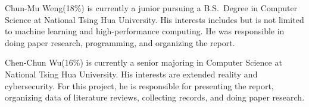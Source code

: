 \documentclass[journal]{IEEEtran}
\begin{document}
\newpage



\nocite{*}



%



\begin{IEEEbiography}{Chun-Mu Weng}(18\%)
is currently a junior pursuing a B.S.~Degree in Computer Science at National Tsing Hua University. His interests includes but is not limited to machine learning and high-performance computing. He was responsible in doing paper research, programming, and organizing the report.
\end{IEEEbiography}

\begin{IEEEbiography}{Chen-Chun Wu}(16\%)
is currently a senior majoring in Computer Science at National Tsing Hua University. His interests are extended reality and cybersecurity. For this project, he is responsible for presenting the report, organizing data of literature reviews, collecting records, and doing paper research.
\end{IEEEbiography}
\end{document}
